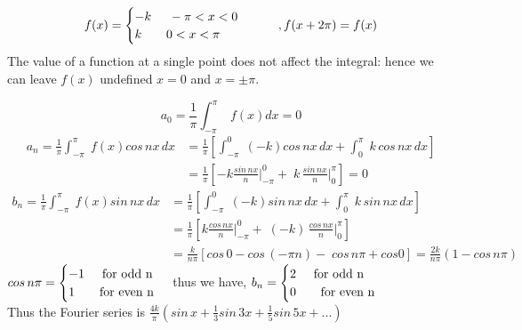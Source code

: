 \documentclass[aima331_lecturenotes_ku.tex]{subfiles}
\begin{document}
\begin{example}
  \begin{equation*}
    f(x) =
    \begin{cases}
      -k \hspace{5mm} -\pi < x < 0 \\
      k \hspace{7mm} 0 < x < \pi
    \end{cases} \hspace{7mm}, f(x+2\pi)=f(x)
  \end{equation*}
  The value of a function at a single point does not affect the integral: hence we can leave $f(x)$ undefined $x=0$ and $x = \pm \pi$.

 $$ a_0 = \frac{1}{\pi} \int_{-\pi}^{\pi} \; f(x) dx = 0$$
 \begin{align*}
      a_n = \frac{1}{\pi} \int_{-\pi}^{\pi} \; f(x)cos\,nx \, dx &= \frac{1}{\pi} \left [ \int_{-\pi}^0 \; (-k)cos\,nx \, dx +  \int_{0}^{\pi} \; k \,cos\,nx \, dx \right ] \\[2mm]
      &= \frac{1}{\pi} \left [  -k \frac{sin\,nx}{n} \Bigg|_{-\pi}^0 +   \; k \,\frac{sin\,nx}{n} \Bigg|_0^{\pi}  \right ] =0
 \end{align*}
 \begin{align*}
      b_n = \frac{1}{\pi} \int_{-\pi}^{\pi} \; f(x)sin\,nx \, dx &= \frac{1}{\pi} \left [ \int_{-\pi}^0 \; (-k)sin\,nx \, dx +  \int_{0}^{\pi} \; k \,sin\,nx \, dx \right ] \\[2mm]
                                                                 &= \frac{1}{\pi} \left [  k \frac{cos\,nx}{n} \Bigg|_{-\pi}^0 +   \; (-k) \,\frac{cos\,nx}{n} \Bigg|_0^{\pi}  \right ] \\[2mm]
   &=\frac{k}{n\pi} \left [cos\,0 - cos\,(-\pi n) - \; cos\,n \pi +cos0   \right ] = \frac{2k}{n\pi}(1-cos\,n\pi)
 \end{align*}
$cos\, n\pi =
\begin{cases}
  -1 \hspace{5mm} \text{for odd n}  \\
      1 \hspace{7mm} \text{for even n}
\end{cases}
$ thus we have, \hspace{4mm} $b_n  =
\begin{cases}
  2 \hspace{5mm} \text{for odd n}  \\
      0 \hspace{7mm} \text{for even n}
\end{cases}
$ \\[1mm]
Thus the Fourier series is $\displaystyle \frac{4k}{\pi} \left ( sin\, x + \frac{1}{3} sin\, 3x + \frac{1}{5} sin\, 5x + ...  \right )$
\end{example}
\end{document}
